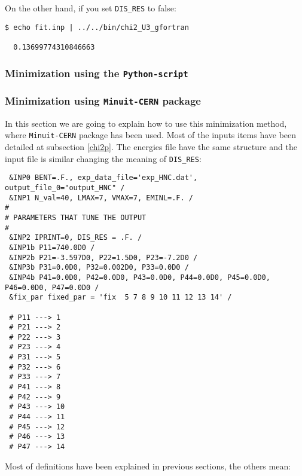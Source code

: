 \documentclass[a4paper,12pt,captions=tableheading]{article}
\begin{document}
On the other hand, if you set \verb~DIS_RES~ to false:

\begin{verbatim}
$ echo fit.inp | ../../bin/chi2_U3_gfortran 

  0.13699774310846663
\end{verbatim}


\subsubsection{Minimization using the \texttt{Python-script}}
\label{sec-3-2-2}

\subsubsection{Minimization using \texttt{Minuit-CERN} package}
\label{sec-3-2-3}

In this section we are going to explain how to use this minimization method, where \verb~Minuit-CERN~ package \cite{minuit} has been used. Most of the inputs items have been detailed at subsection \ref{chi2p}. The energies file have the same structure and the input file is similar changing the meaning of \verb~DIS_RES~:

\begin{verbatim}
 &INP0 BENT=.F., exp_data_file='exp_HNC.dat', output_file_0="output_HNC" / 
 &INP1 N_val=40, LMAX=7, VMAX=7, EMINL=.F. /
#
# PARAMETERS THAT TUNE THE OUTPUT
#
 &INP2 IPRINT=0, DIS_RES = .F. /
 &INP1b P11=740.0D0 /
 &INP2b P21=-3.597D0, P22=1.5D0, P23=-7.2D0 /
 &INP3b P31=0.0D0, P32=0.002D0, P33=0.0D0 /
 &INP4b P41=0.0D0, P42=0.0D0, P43=0.0D0, P44=0.0D0, P45=0.0D0, P46=0.0D0, P47=0.0D0 /
 &fix_par fixed_par = 'fix  5 7 8 9 10 11 12 13 14' /
 
 # P11 ---> 1
 # P21 ---> 2
 # P22 ---> 3
 # P23 ---> 4
 # P31 ---> 5
 # P32 ---> 6
 # P33 ---> 7
 # P41 ---> 8
 # P42 ---> 9
 # P43 ---> 10
 # P44 ---> 11
 # P45 ---> 12
 # P46 ---> 13
 # P47 ---> 14
\end{verbatim}

Most of definitions have been explained in previous sections, the others mean:
\end{document}
